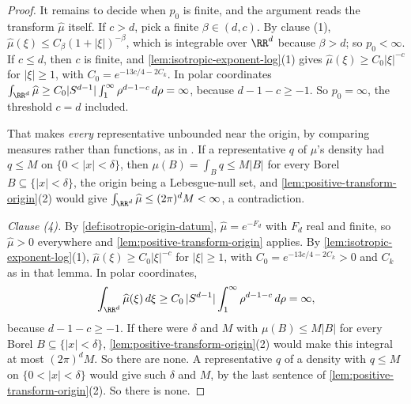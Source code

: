 \begin{proof}
It remains to decide when $p_0$ is finite, and the argument reads the transform $\widehat\mu$
itself. If $c > d$, pick a finite $\beta \in (d,c)$. By clause (1),
$\widehat\mu(\xi) \le C_\beta(1+|\xi|)^{-\beta}$, which is integrable over $\RR^d$ because
$\beta > d$; so $p_0 < \infty$. If $c \le d$, then $c$ is finite, and
\ref{lem:isotropic-exponent-log}(1) gives $\widehat\mu(\xi) \ge C_0|\xi|^{-c}$ for $|\xi| \ge 1$,
with $C_0 = e^{-13c/4 - 2C_k}$. In polar coordinates
$\int_{\RR^d}\widehat\mu \ge C_0|S^{d-1}|\int_1^\infty\rho^{d-1-c}\,d\rho = \infty$, because
$d - 1 - c \ge -1$. So $p_0 = \infty$, the threshold $c = d$ included.

That makes \emph{every} representative unbounded near the origin, by comparing measures rather than
functions, as in . If a representative $q$ of $\mu$'s density had $q \le M$ on
$\{0 < |x| < \delta\}$, then $\mu(B) = \int_B q \le M|B|$ for every Borel
$B \subseteq \{|x| < \delta\}$, the origin being a Lebesgue-null set, and
\ref{lem:positive-transform-origin}(2) would give $\int_{\RR^d}\widehat\mu \le (2\pi)^dM < \infty$,
a contradiction.

\emph{Clause (4).} By \ref{def:isotropic-origin-datum}, $\widehat\mu = e^{-F_d}$ with $F_d$ real
and finite, so $\widehat\mu > 0$ everywhere and \ref{lem:positive-transform-origin} applies. By
\ref{lem:isotropic-exponent-log}(1), $\widehat\mu(\xi) \ge C_0|\xi|^{-c}$ for $|\xi| \ge 1$, with
$C_0 = e^{-13c/4 - 2C_k} > 0$ and $C_k$ as in that lemma. In polar coordinates,
\[
  \int_{\RR^d}\widehat\mu(\xi)\,d\xi \ge C_0\,|S^{d-1}|\int_1^\infty \rho^{d-1-c}\,d\rho = \infty ,
\]
because $d - 1 - c \ge -1$. If there were $\delta$ and $M$ with $\mu(B) \le M|B|$ for every Borel
$B \subseteq \{|x| < \delta\}$, \ref{lem:positive-transform-origin}(2) would make this integral at
most $(2\pi)^dM$. So there are none. A representative $q$ of a density with $q \le M$ on
$\{0 < |x| < \delta\}$ would give such $\delta$ and $M$, by the last sentence of
\ref{lem:positive-transform-origin}(2). So there is none.


\end{proof}
